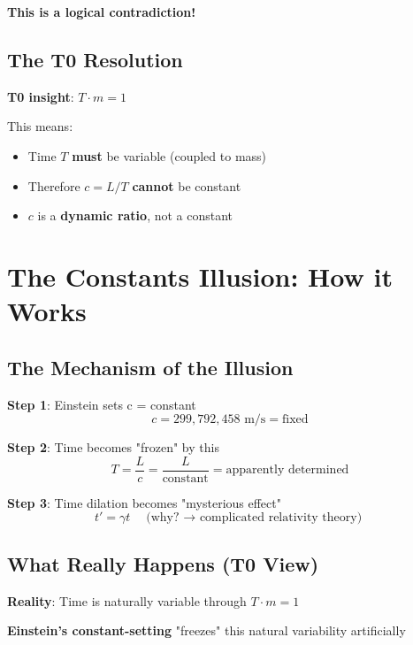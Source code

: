 \documentclass[12pt,a4paper]{article}
\newcommand{\Tfield}{T}
\begin{document}
	\textbf{This is a logical contradiction!}
	
	\subsection{The T0 Resolution}
	
	\textbf{T0 insight}: $\Tfield \cdot m = 1$
	
	This means:
	\begin{itemize}
		\item Time $\Tfield$ \textbf{must} be variable (coupled to mass)
		\item Therefore $c = L/T$ \textbf{cannot} be constant
		\item $c$ is a \textbf{dynamic ratio}, not a constant
	\end{itemize}
	
	\section{The Constants Illusion: How it Works}
	
	\subsection{The Mechanism of the Illusion}
	
	\textbf{Step 1}: Einstein sets c = constant
	\begin{equation}
		c = 299,792,458 \text{ m/s} = \text{fixed}
	\end{equation}
	
	\textbf{Step 2}: Time becomes "frozen" by this
	\begin{equation}
		T = \frac{L}{c} = \frac{L}{\text{constant}} = \text{apparently determined}
	\end{equation}
	
	\textbf{Step 3}: Time dilation becomes "mysterious effect"
	\begin{equation}
		t' = \gamma t \quad \text{(why? $\rightarrow$ complicated relativity theory)}
	\end{equation}
	
	\subsection{What Really Happens (T0 View)}
	
	\textbf{Reality}: Time is naturally variable through $\Tfield \cdot m = 1$
	
	\textbf{Einstein's constant-setting} "freezes" this natural variability artificially
	
\end{document}
